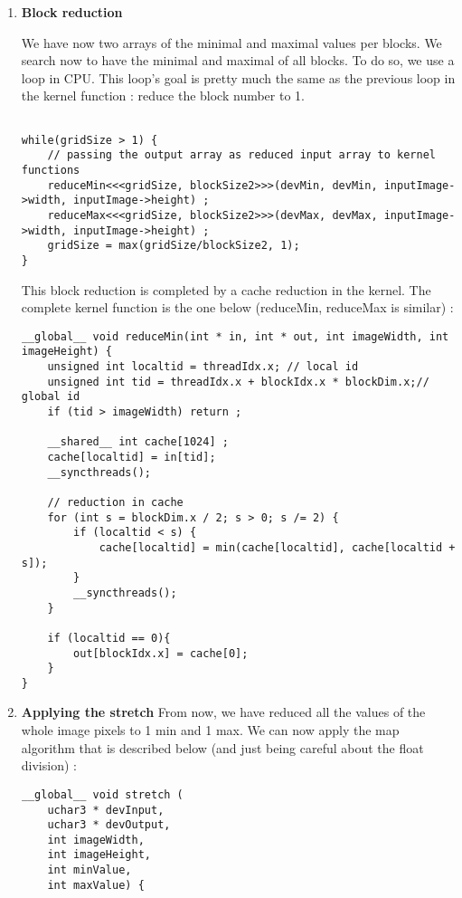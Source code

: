 \documentclass{article}
\begin{document}
\begin{enumerate}
    \item \textbf{Block reduction}
    
    We have now two arrays of the minimal and maximal values per blocks. We search now to have the minimal and maximal of all blocks. To do so, we use a loop in CPU. This loop's goal is pretty much the same as the previous loop in the kernel function : reduce the block number to 1. 
    
    \begin{verbatim}
    
while(gridSize > 1) {
    // passing the output array as reduced input array to kernel functions
    reduceMin<<<gridSize, blockSize2>>>(devMin, devMin, inputImage->width, inputImage->height) ;
    reduceMax<<<gridSize, blockSize2>>>(devMax, devMax, inputImage->width, inputImage->height) ;
    gridSize = max(gridSize/blockSize2, 1);
}
    \end{verbatim}
    
    This block reduction is completed by a cache reduction in the kernel. The complete kernel function is the one below (reduceMin, reduceMax is similar) : 
    
    \begin{verbatim}
__global__ void reduceMin(int * in, int * out, int imageWidth, int imageHeight) {	
    unsigned int localtid = threadIdx.x; // local id 
    unsigned int tid = threadIdx.x + blockIdx.x * blockDim.x;// global id 
    if (tid > imageWidth) return ;
	
    __shared__ int cache[1024] ;
    cache[localtid] = in[tid];
    __syncthreads();
	
    // reduction in cache
    for (int s = blockDim.x / 2; s > 0; s /= 2) {
        if (localtid < s) {
            cache[localtid] = min(cache[localtid], cache[localtid + s]);
        }
        __syncthreads();
    }		
	
    if (localtid == 0){ 
        out[blockIdx.x] = cache[0]; 
    }
}
    \end{verbatim}
    
    \item \textbf{Applying the stretch}
    From now, we have reduced all the values of the whole image pixels to 1 min and 1 max. We can now apply the map algorithm that is described below (and just being careful about the float division) : 
    
    \begin{verbatim}
__global__ void stretch (
    uchar3 * devInput, 
    uchar3 * devOutput, 
    int imageWidth, 
    int imageHeight, 
    int minValue, 
    int maxValue) {
    

\end{verbatim}
\end{enumerate}
\end{document}

